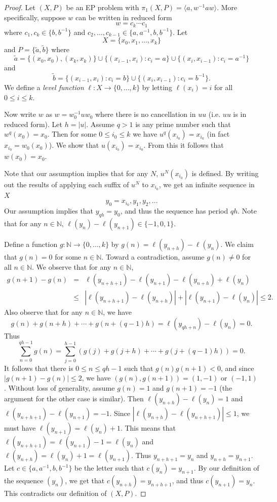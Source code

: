 \documentclass[10pt,a4paper]{amsart}
\theoremstyle{definition}
\theoremstyle{definition}
\numberwithin{equation}{section}
\begin{document}
\begin{proof} Let $(X, P)$ be an EP problem with $\pi_1(X, P)=\langle a, w^{-1}aw\rangle$. More specifically, suppose $w$ can be written in reduced form 
$$ w=c_k\cdots c_1 $$
where $c_1, c_k\in \{b, b^{-1}\}$ and $c_2, \dots, c_{k-1}\in \{a, a^{-1}, b, b^{-1}\}$. Let 
$$X=\{x_0, x_1, \dots, x_k\}$$ and $P=\{\tilde{a}, \tilde{b}\}$ where
$$ \tilde{a}=\{(x_0, x_0), (x_k, x_k)\}\cup \big\{(x_{i-1}, x_{i})\colon c_i=a\big\}\cup\big\{(x_i, x_{i-1})\colon c_i=a^{-1}\big\} $$
and
$$ \tilde{b}=\big\{(x_{i-1}, x_i)\colon c_i=b\big\}\cup\{(x_i, x_{i-1})\colon c_i=b^{-1}\big\}. $$
We define a {\em level function} $\ell\colon X\to \{0, \dots, k\}$ by letting $\ell(x_i)=i$ for all $0\leq i\leq k$.

Now write $w$ as $w=w_0^{-1}uw_0$ where there is no cancellation in $uu$ (i.e. $uu$ is in reduced form). Let $h=|u|$. Assume $q>1$ is any prime number such that $w^q(x_0)=x_0$. Then for some $0\leq i_0\leq k$ we have $u^q(x_{i_0})=x_{i_0}$ (in fact $x_{i_0}=w_0(x_0)$). We show that $u(x_{i_0})=x_{i_0}$. From this it follows that $w(x_0)=x_0$. 

Note that our assumption implies that for any $N$, $u^N(x_{i_0})$ is defined. By writing out the results of applying each suffix of $u^N$ to $x_{i_0}$, we get an infinite sequence in $X$
$$ y_0=x_{i_0}, y_1, y_2, \dots $$
Our assumption implies that $y_{qh}=y_0$, and thus the sequence has period $qh$. Note that for any $n\in\mathbb{N}$, $\ell(y_n)-\ell(y_{n+1})\in\{-1,0,1\}$. 

Define a function $g\colon \mathbb{N}\to\{0,\dots, k\}$ by $g(n)=\ell(y_{n+h})-\ell(y_n)$. We claim that $g(n)=0$ for some $n\in\mathbb{N}$. Toward a contradiction, assume $g(n)\neq 0$ for all $n\in\mathbb{N}$. We observe that for any $n\in\mathbb{N}$, 
$$ \begin{array}{rcl} g(n+1)-g(n)&=&\ell(y_{n+h+1})-\ell(y_{n+1})-\ell(y_{n+h})+\ell(y_n) \\
& \leq &|\ell(y_{n+h+1})-\ell(y_{n+h})|+|\ell(y_{n+1})-\ell(y_n)| \leq 2.
\end{array}$$
Also observe that for any $n\in\mathbb{N}$, we have
$$ g(n)+g(n+h)+\cdots+g(n+(q-1)h)=\ell(y_{qh+n})-\ell(y_n)=0. $$
Thus 
$$ \displaystyle\sum_{n=0}^{qh-1}g(n)=\displaystyle\sum_{j=0}^{h-1}(g(j)+g(j+h)+\cdots+g(j+(q-1)h))=0. $$
It follows that there is $0\leq n\leq qh-1$ such that $g(n)g(n+1)<0$, and since $|g(n+1)-g(n)|\leq 2$, we have $(g(n), g(n+1))=(1,-1)$ or $(-1,1)$. Without loss of generality, assume $g(n)=1$ and $g(n+1)=-1$ (the argument for the other case is similar). 
Then $\ell(y_{n+h})-\ell(y_n)=1$ and $\ell(y_{n+h+1})-\ell(y_{n+1})=-1$. Since $|\ell(y_{n+h})-\ell(y_{n+h+1})|\leq 1$, we must have $\ell(y_{n+1})=\ell(y_n)+1$. This means that $\ell(y_{n+h+1})=\ell(y_{n+1})-1=\ell(y_n)$ and $\ell(y_{n+h})=\ell(y_n)+1=\ell(y_{n+1})$. Thus $y_{n+h+1}=y_n$ and $y_{n+h}=y_{n+1}$. Let $c\in\{a, a^{-1}, b, b^{-1}\}$ be the letter such that $c(y_n)=y_{n+1}$. By our definition of the sequence $(y_n)$, we get that $c(y_{n+h})=y_{n+h+1}$, and thus $c(y_{n+1})=y_n$. This contradicts our definition of $(X, P)$. 



\end{proof}
\end{document}
